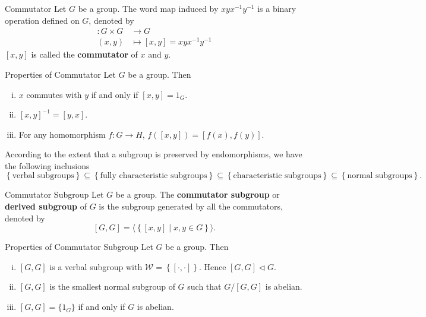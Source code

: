 \begin{definition}{Commutator}{}
    Let $G$ be a group. The word map induced by $xyx^{-1}y^{-1}$ is a binary operation defined on $G$, denoted by
    \begin{align*}
        [\cdot,\cdot]:G\times G & \longrightarrow G                \\
        (x,y)                   & \longmapsto [x,y]=xyx^{-1}y^{-1}
    \end{align*}
    $[x,y]$ is called the \textbf{commutator} of $x$ and $y$.
\end{definition}

\begin{proposition}{Properties of Commutator}{}
    Let $G$ be a group. Then
    \begin{enumerate}[(i)]
        \item $x$ commutes with $y$ if and only if $[x,y]=1_G$.
        \item $[x,y]^{-1}=[y,x]$.
        \item For any homomorphism $f:G\to H$, $f([x,y])=[f(x),f(y)]$.
    \end{enumerate}
\end{proposition}

\begin{proposition}{}{}
    According to the extent that a subgroup is preserved by endomorphisms, we have the following inclusions
    \[
        \left\{\text{verbal subgroups}\right\}\subseteq \left\{\text{fully characteristic subgroups}\right\}\subseteq \left\{\text{characteristic subgroups}\right\}\subseteq\left\{\text{normal subgroups}\right\}.
    \]
\end{proposition}


\begin{definition}{Commutator Subgroup}{}
    Let $G$ be a group. The \textbf{commutator subgroup} or \textbf{derived subgroup} of $G$ is the subgroup generated by all the commutators, denoted by
    $$
        [G,G]=\langle \left\{[x,y]\mid x,y\in G \right\}\rangle.
    $$
\end{definition}

\begin{proposition}{Properties of Commutator Subgroup}{}
    Let $G$ be a group. Then
    \begin{enumerate}[(i)]
        \item $[G,G]$ is a verbal subgroup with $\mathcal{W}=\left\{ [\cdot,\cdot] \right\}$. Hence $[G,G]\lhd G$.
        \item $[G,G]$ is the smallest normal subgroup of $G$ such that $G/[G,G]$ is abelian.
        \item $[G,G]=\{1_G\}$ if and only if $G$ is abelian.
    \end{enumerate}
\end{proposition}


